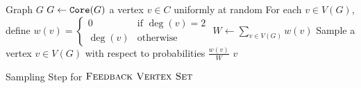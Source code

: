 \documentclass[letterpaper,11pt]{article}
\newcommand{\1}[1]{\mathds{1}\left[#1\right]}
\newcommand{\core}[1]{\textnormal{\texttt{Core}}(#1)}
\newcommand{\fvs}{\textsc{Feedback Vertex Set}\xspace}
\begin{document}
\begin{algorithm}
	\begin{algorithmic}[1]
		\Input Graph $G$
		\State $G \gets \core{G}$
			\State \Return a vertex $v \in C$ uniformly at random \label{line:conn_comp_max_deg_2}
		\EndIf
		\State For each $v \in V(G)$, define $w(v) = \begin{cases}
			0 &\text{if } \deg(v) = 2\\
			\deg(v) &\text{otherwise} 
		\end{cases}$
		\State $W \gets \sum_{v \in V(G)} w(v)$
		\State Sample a vertex $v \in V(G)$ with respect to probabilities $\frac{w(v)}{W}$
		\State \Return $v$
	\end{algorithmic}
	\caption{Sampling Step for $\fvs$}\label{algorithm:fvs_sampling_step}
\end{algorithm}
\end{document}
